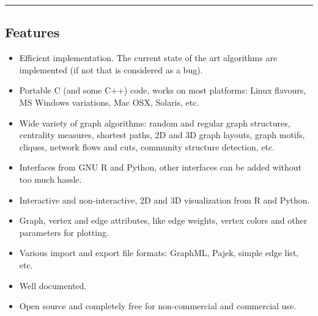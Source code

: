 \documentclass[a3]{sciposter}
\begin{document}
\vspace*{-0.7cm}
\vfill
\hrule
\vfill
\vspace*{-0.3cm}
\begin{multicols}{3}

\RaggedRight


\section{Features}

\begin{itemize}
\item Efficient implementation. The current state of the art
  algorithms are implemented (if not that is considered as a bug).
\item Portable C (and some C++) code, works on most platforms:
  Linux flavours, MS Windows variations, Mac OSX, Solaris, etc.
\item Wide variety of graph algorithms: random and regular graph
  structures, centrality measures, shortest paths, 2D and 3D graph
  layouts, graph motifs, cliques, network flows and cuts, community
  structure detection, etc.
\item Interfaces from GNU R and Python, other interfaces can be added
  without too much hassle.
\item Interactive and non-interactive, 2D and 3D
  visualization from R and Python.
\item Graph, vertex and edge attributes, like edge weights, vertex
  colors and other parameters for plotting.
\item Various import and export file formats: GraphML, Pajek, simple
  edge list, etc.
\item Well documented.
\item Open source and completely free for non-commercial and
  commercial use.
\end{itemize}


\end{multicols}
\end{document}
